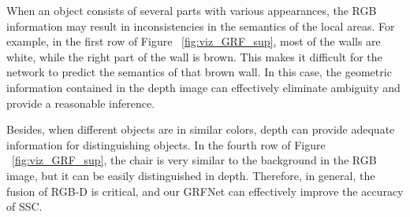 \documentclass[10pt,twocolumn,letterpaper]{article}
\begin{document}
When an object consists of several parts with various appearances, the RGB information may result in inconsistencies in the semantics of the local areas.
For example, in the first row of Figure ~\ref{fig:viz_GRF_sup}, most of the walls are white, while the right part of the wall is brown. This makes it difficult for the network to predict the semantics of that brown wall.
In this case, the geometric information contained in the depth image can effectively eliminate ambiguity and provide a reasonable inference.

Besides, when different objects are in similar colors, depth can provide adequate information for distinguishing objects.
In the fourth row of Figure ~\ref{fig:viz_GRF_sup}, the chair is very similar to the background in the RGB image, but it can be easily distinguished in depth.
Therefore, in general, the fusion of RGB-D is critical, and our GRFNet can effectively improve the accuracy of SSC.
\end{document}
